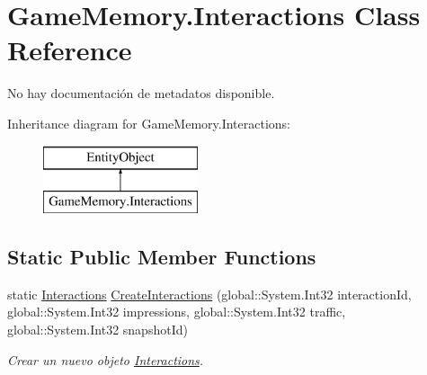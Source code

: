 \hypertarget{class_game_memory_1_1_interactions}{\section{Game\-Memory.\-Interactions Class Reference}
\label{class_game_memory_1_1_interactions}
}


No hay documentación de metadatos disponible.  


Inheritance diagram for Game\-Memory.\-Interactions\-:\begin{figure}[H]
\begin{center}
\leavevmode
\includegraphics[height=2.000000cm]{class_game_memory_1_1_interactions}
\end{center}
\end{figure}
\subsection*{Static Public Member Functions}
\begin{DoxyCompactItemize}
\item 
static \hyperlink{class_game_memory_1_1_interactions}{Interactions} \hyperlink{class_game_memory_1_1_interactions_a9fb4c4f81722d631a66fbe9587f71336}{Create\-Interactions} (global\-::\-System.\-Int32 interaction\-Id, global\-::\-System.\-Int32 impressions, global\-::\-System.\-Int32 traffic, global\-::\-System.\-Int32 snapshot\-Id)
\begin{DoxyCompactList}\small\item\em Crear un nuevo objeto \hyperlink{class_game_memory_1_1_interactions}{Interactions}. \end{DoxyCompactList}\end{DoxyCompactItemize}
